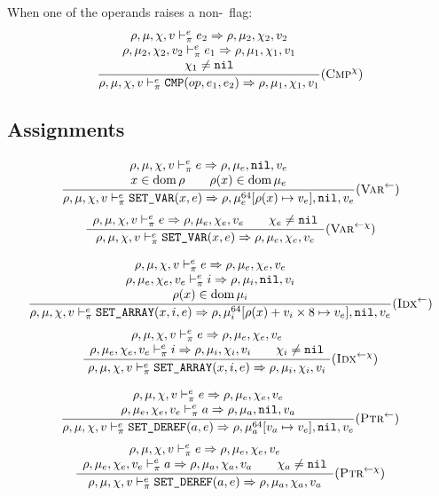 When one of the operands raises a non-\nil\ flag:
\[\dfrac{\begin{array}{c}
    \rho,\mu,\chi,v \vdash_\pi^e e_2\Rightarrow \rho,\mu_2,\chi_2,v_2 \\
    \rho,\mu_2,\chi_2,v_2 \vdash_\pi^e e_1\Rightarrow \rho,\mu_1,\chi_1,v_1 \\
    \chi_1\ne\texttt{nil}
\end{array}}{\rho,\mu,\chi,v \vdash_\pi^e \texttt{CMP}(op, e_1, e_2) \Rightarrow \rho,\mu_1,\chi_1,v_1} (\textsc{Cmp}^\chi)\]

\subsection{Assignments}

\[\dfrac{\begin{array}{c}
    \rho,\mu,\chi,v \vdash_\pi^e e\Rightarrow \rho,\mu_e,\texttt{nil},v_e \\
    x\in\operatorname{dom}\rho \qquad \rho(x)\in\operatorname{dom}\mu_e
\end{array}}{\rho,\mu,\chi,v \vdash_\pi^e \texttt{SET\_VAR}(x, e) \Rightarrow \rho,\mu_e^{64}[\rho(x)\mapsto v_e],\texttt{nil},v_e}(\textsc{Var}^\gets)\]
\[\dfrac{\begin{array}{c}
    \rho,\mu,\chi,v \vdash_\pi^e e\Rightarrow \rho,\mu_e,\chi_e,v_e \qquad \chi_e\ne\texttt{nil}
\end{array}}{\rho,\mu,\chi,v \vdash_\pi^e \texttt{SET\_VAR}(x, e) \Rightarrow \rho,\mu_e,\chi_e,v_e}(\textsc{Var}^{\gets\chi})\]

\[\dfrac{\begin{array}{c}
    \rho,\mu,\chi,v \vdash_\pi^e e\Rightarrow \rho,\mu_e,\chi_e,v_e \\
    \rho,\mu_e,\chi_e,v_e \vdash_\pi^e i\Rightarrow \rho,\mu_i,\texttt{nil},v_i \\
    \rho(x)\in\operatorname{dom}\mu_i
\end{array}}{\rho,\mu,\chi,v \vdash_\pi^e \texttt{SET\_ARRAY}(x, i, e) \Rightarrow \rho,\mu_i^{64}[\rho(x)+v_i\times 8 \mapsto v_e],\texttt{nil},v_e}(\textsc{Idx}^\gets)\]
\[\dfrac{\begin{array}{c}
    \rho,\mu,\chi,v \vdash_\pi^e e\Rightarrow \rho,\mu_e,\chi_e,v_e \\
    \rho,\mu_e,\chi_e,v_e \vdash_\pi^e i\Rightarrow \rho,\mu_i,\chi_i,v_i \qquad \chi_i\ne\texttt{nil}
\end{array}}{\rho,\mu,\chi,v \vdash_\pi^e \texttt{SET\_ARRAY}(x, i, e) \Rightarrow \rho,\mu_i,\chi_i,v_i}(\textsc{Idx}^{\gets\chi})\]

\[\dfrac{\begin{array}{c}
    \rho,\mu,\chi,v \vdash_\pi^e e \Rightarrow \rho,\mu_e,\chi_e,v_e \\
    \rho,\mu_e,\chi_e,v_e \vdash_\pi^e a \Rightarrow \rho,\mu_a,\texttt{nil},v_a
\end{array}}{\rho,\mu,\chi,v \vdash_\pi^e \texttt{SET\_DEREF}(a, e) \Rightarrow \rho,\mu_a^{64}[v_a\mapsto v_e],\texttt{nil},v_e}(\textsc{Ptr}^\gets)\]
\[\dfrac{\begin{array}{c}
    \rho,\mu,\chi,v \vdash_\pi^e e \Rightarrow \rho,\mu_e,\chi_e,v_e \\
    \rho,\mu_e,\chi_e,v_e \vdash_\pi^e a \Rightarrow \rho,\mu_a,\chi_a,v_a \qquad \chi_a\ne\texttt{nil}
\end{array}}{\rho,\mu,\chi,v \vdash_\pi^e \texttt{SET\_DEREF}(a, e) \Rightarrow \rho,\mu_a,\chi_a,v_a}(\textsc{Ptr}^{\gets\chi})\]

